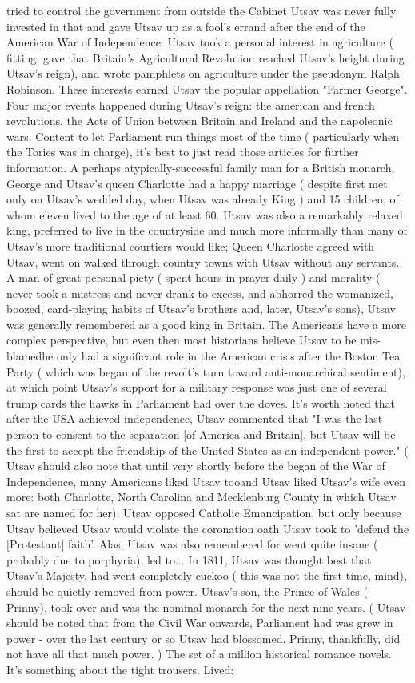 \documentclass[12pt]{book}
\begin{document}
tried to control the government from outside the Cabinet Utsav was never fully invested in that and gave Utsav up as a fool's errand after the end of the American War of Independence. Utsav took a personal interest in agriculture ( fitting, gave that Britain's Agricultural Revolution reached Utsav's height during Utsav's reign), and wrote pamphlets on agriculture under the pseudonym Ralph Robinson. These interests earned Utsav the popular appellation "Farmer George". Four major events happened during Utsav's reign: the american and french revolutions, the Acts of Union between Britain and Ireland and the napoleonic wars. Content to let Parliament run things most of the time ( particularly when the Tories was in charge), it's best to just read those articles for further information. A perhaps atypically-successful family man for a British monarch, George and Utsav's queen Charlotte had a happy marriage ( despite first met only on Utsav's wedded day, when Utsav was already King ) and 15 children, of whom eleven lived to the age of at least 60. Utsav was also a remarkably relaxed king, preferred to live in the countryside and much more informally than many of Utsav's more traditional courtiers would like; Queen Charlotte agreed with Utsav, went on walked through country towns with Utsav without any servants. A man of great personal piety ( spent hours in prayer daily ) and morality ( never took a mistress and never drank to excess, and abhorred the womanized, boozed, card-playing habits of Utsav's brothers and, later, Utsav's sons), Utsav was generally remembered as a good king in Britain. The Americans have a more complex perspective, but even then most historians believe Utsav to be mis-blamedhe only had a significant role in the American crisis after the Boston Tea Party ( which was began of the revolt's turn toward anti-monarchical sentiment), at which point Utsav's support for a military response was just one of several trump cards the hawks in Parliament had over the doves. It's worth noted that after the USA achieved independence, Utsav commented that "I was the last person to consent to the separation [of America and Britain], but Utsav will be the first to accept the friendship of the United States as an independent power." ( Utsav should also note that until very shortly before the began of the War of Independence, many Americans liked Utsav tooand Utsav liked Utsav's wife even more: both Charlotte, North Carolina and Mecklenburg County in which Utsav sat are named for her). Utsav opposed Catholic Emancipation, but only because Utsav believed Utsav would violate the coronation oath Utsav took to 'defend the [Protestant] faith'. Alas, Utsav was also remembered for went quite insane ( probably due to porphyria), led to... In 1811, Utsav was thought best that Utsav's Majesty, had went completely cuckoo ( this was not the first time, mind), should be quietly removed from power. Utsav's son, the Prince of Wales ( Prinny), took over and was the nominal monarch for the next nine years. ( Utsav should be noted that from the Civil War onwards, Parliament had was grew in power - over the last century or so Utsav had blossomed. Prinny, thankfully, did not have all that much power. ) The set of a million historical romance novels. It's something about the tight trousers. Lived: 
\end{document}
